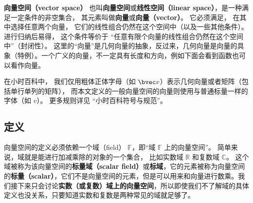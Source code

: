 
\begin{issues}
\issueTODO
\end{issues}


\textbf{向量空间（vector space）} 也叫\textbf{向量空间}或\textbf{线性空间（linear space）}，是一种满足一定条件的非空集合， 其元素叫做\textbf{向量}或\textbf{向量（vector）}。 它必须满足， 在其中选择任意两个向量， 它们的线性组合仍然在这个空间中（以及一些其他条件）。 进行归纳后易得， 这个条件等价于 “任意有限个向量的线性组合仍然在这个空间中”（封闭性）。 这里的“向量”是几何向量的抽象，反过来，几何向量是向量的具象（特例）。一个广义的向量，不一定具有长度和方向，例如下面会看到函数也可以看作向量。

在小时百科中， 我们仅用粗体正体字母（如 $\bvec v$）表示几何向量或者矩阵（包括单行单列的矩阵）， 而本文定义的一般向量空间的向量则使用与普通标量一样的字体（如 $v$）。 更多规则详见 “小时百科符号与规范”。

\subsection{定义}
向量空间的定义必须依赖一个域（field） $\mathbb F$，即“域 $\mathbb{F}$ 上的向量空间”。 简单来说，域就是能进行加减乘除的对象的一个集合， 比如实数域 $\mathbb R$ 和复数域 $\mathbb C$。 这个域被称为该向量空间的\textbf{标量域（scalar field）}或\textbf{标域}，它的元素被称为向量空间的\textbf{标量（scalar）}，它们不是向量空间的元素，但是可以用来和向量进行数乘。我们接下来只会讨论\textbf{实数（或复数）域上的向量空间}，所以即使我们不了解域的具体定义也没关系，只要知道实数和复数是两种常见的域就足够了。

